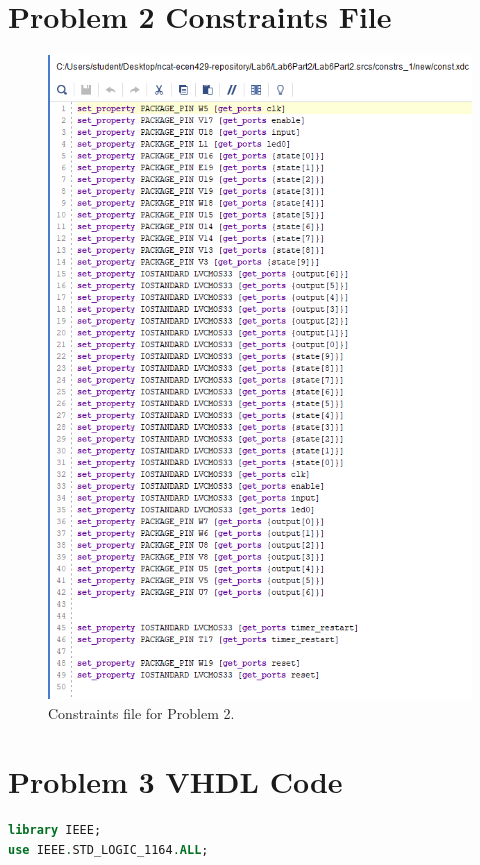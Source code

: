 \documentclass[11pt]{article}
\begin{document}
\begin{appendices}
\section{Problem 2 Constraints File}
\begin{center}
\begin{figure}
	\includegraphics[scale=1]{./images/Lab6Part2Const.png}
	\caption{\label{fig:Prob1Const}Constraints file for Problem 2.}
\end{figure}
\end{center}

\section{Problem 3 VHDL Code}
\begin{lstlisting}[language=VHDL]
library IEEE;
use IEEE.STD_LOGIC_1164.ALL;


\end{lstlisting}
\end{appendices}
\end{document}
